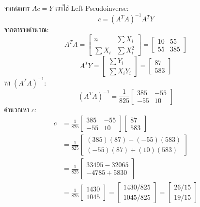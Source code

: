 \documentclass[12pt,a4paper]{article}
\begin{document}
จากสมการ $Ac = Y$ เราใช้ Left Pseudoinverse:
\[
    c = (A^T A)^{-1} A^T Y
\]
จากตารางคำนวณ:
\[
    A^T A = \begin{bmatrix} n & \sum X_i \\ \sum X_i & \sum X_i^2 \end{bmatrix} = \begin{bmatrix} 10 & 55 \\ 55 & 385 \end{bmatrix}
\]
\[
    A^T Y = \begin{bmatrix} \sum Y_i \\ \sum X_i Y_i \end{bmatrix} = \begin{bmatrix} 87 \\ 583 \end{bmatrix}
\]
หา $(A^T A)^{-1}$:
\[
    (A^T A)^{-1} = \frac{1}{825} \begin{bmatrix} 385 & -55 \\ -55 & 10 \end{bmatrix}
\]
คำนวณหา $c$:
\begin{align*}
    c &= \frac{1}{825} \begin{bmatrix} 385 & -55 \\ -55 & 10 \end{bmatrix} \begin{bmatrix} 87 \\ 583 \end{bmatrix} \\[6pt]
      &= \frac{1}{825} \begin{bmatrix} (385)(87) + (-55)(583) \\ (-55)(87) + (10)(583) \end{bmatrix} \\[6pt]
      &= \frac{1}{825} \begin{bmatrix} 33495 - 32065 \\ -4785 + 5830 \end{bmatrix} \\[6pt]
      &= \frac{1}{825} \begin{bmatrix} 1430 \\ 1045 \end{bmatrix} = \begin{bmatrix} 1430/825 \\ 1045/825 \end{bmatrix} = \begin{bmatrix} 26/15 \\ 19/15 \end{bmatrix}
\end{align*}
\end{document}
